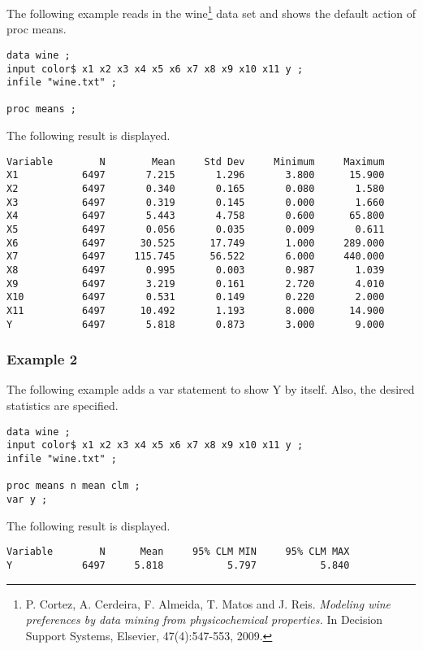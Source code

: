 \documentclass[12pt]{article}
\begin{document}
The following example reads in the wine\footnote{
P. Cortez, A. Cerdeira, F. Almeida, T. Matos and J. Reis.
{\it Modeling wine preferences by data mining from physicochemical properties.}
In Decision Support Systems, Elsevier, 47(4):547-553, 2009.}
data set and shows the default action of proc means.

{\footnotesize\begin{verbatim}
data wine ;
input color$ x1 x2 x3 x4 x5 x6 x7 x8 x9 x10 x11 y ;
infile "wine.txt" ;

proc means ;
\end{verbatim}}

The following result is displayed.

{\footnotesize\begin{verbatim}
Variable        N        Mean     Std Dev     Minimum     Maximum
X1           6497       7.215       1.296       3.800      15.900
X2           6497       0.340       0.165       0.080       1.580
X3           6497       0.319       0.145       0.000       1.660
X4           6497       5.443       4.758       0.600      65.800
X5           6497       0.056       0.035       0.009       0.611
X6           6497      30.525      17.749       1.000     289.000
X7           6497     115.745      56.522       6.000     440.000
X8           6497       0.995       0.003       0.987       1.039
X9           6497       3.219       0.161       2.720       4.010
X10          6497       0.531       0.149       0.220       2.000
X11          6497      10.492       1.193       8.000      14.900
Y            6497       5.818       0.873       3.000       9.000
\end{verbatim}}

\subsubsection*{Example 2}

The following example adds a var statement to show Y by itself.
Also, the desired statistics are specified.

{\footnotesize\begin{verbatim}
data wine ;
input color$ x1 x2 x3 x4 x5 x6 x7 x8 x9 x10 x11 y ;
infile "wine.txt" ;

proc means n mean clm ;
var y ;
\end{verbatim}}

The following result is displayed.

{\footnotesize\begin{verbatim}
Variable        N      Mean     95% CLM MIN     95% CLM MAX
Y            6497     5.818           5.797           5.840
\end{verbatim}}
\end{document}
